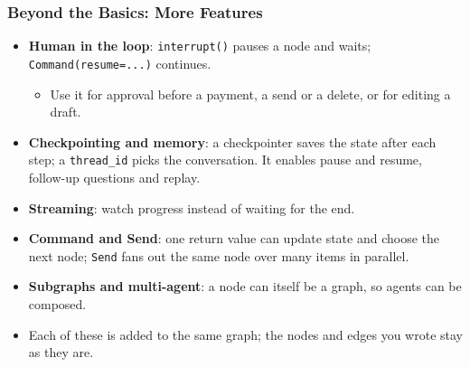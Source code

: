 \begin{frame}[fragile]\frametitle{Beyond the Basics: More Features}
      \begin{itemize}
        \item \textbf{Human in the loop}: \texttt{interrupt()} pauses a node and waits; \texttt{Command(resume=...)} continues.
        \begin{itemize}
          \item Use it for approval before a payment, a send or a delete, or for editing a draft.
        \end{itemize}
        \item \textbf{Checkpointing and memory}: a checkpointer saves the state after each step; a \texttt{thread\_id} picks the conversation. It enables pause and resume, follow-up questions and replay.
        \item \textbf{Streaming}: watch progress instead of waiting for the end.
        \item \textbf{Command and Send}: one return value can update state and choose the next node; \texttt{Send} fans out the same node over many items in parallel.
        \item \textbf{Subgraphs and multi-agent}: a node can itself be a graph, so agents can be composed.
        \item Each of these is added to the same graph; the nodes and edges you wrote stay as they are.
      \end{itemize}
\end{frame}

